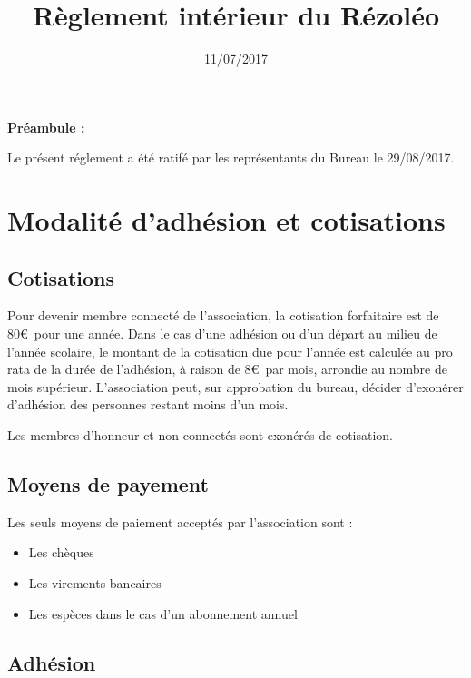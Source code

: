 \documentclass[12pt]{article}
\begin{document}
\title{Règlement intérieur du Rézoléo}
\author{}
\date{11/07/2017}
\maketitle

\textbf{\large{Préambule : \\}}

\noindent Le présent réglement a été ratifé par les représentants du Bureau le  29/08/2017.

\newpage

\tableofcontents

\newpage

\section{Modalité d'adhésion et cotisations}
	\subsection{Cotisations}

		Pour devenir membre connecté de l'association, la cotisation forfaitaire est de 80\euro \ pour une année. Dans le cas d'une adhésion ou d'un départ au milieu de l'année scolaire, le montant de la cotisation due pour l'année est calculée au pro rata de la durée de l'adhésion, à raison de 8\euro \ par mois, arrondie au nombre de mois supérieur. L'association peut, sur approbation du bureau, décider d'exonérer d'adhésion des personnes restant moins d'un mois.

		Les membres d'honneur et non connectés sont exonérés de cotisation.

    \subsection{Moyens de payement}

		Les seuls moyens de paiement acceptés par l'association sont :

		\begin{itemize}
			\item[\textbullet] Les chèques
			\item[\textbullet] Les virements bancaires
			\item[\textbullet] Les espèces dans le cas d'un abonnement annuel 
		\end{itemize}


    \subsection{Adhésion}
\end{document}
